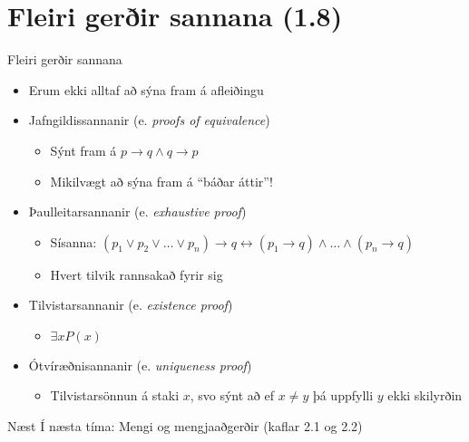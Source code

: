 \documentclass[handout]{beamer}
\begin{document}
\section{Fleiri gerðir sannana (1.8)}

\begin{frame}{Fleiri gerðir sannana}
    \begin{itemize}
        \item Erum ekki alltaf að sýna fram á afleiðingu
        \item Jafngildissannanir (e. \emph{proofs of equivalence})
        \begin{itemize}
            \item Sýnt fram á $p \to q \land q \to p$
            \item Mikilvægt að sýna fram á ``báðar áttir''!
        \end{itemize}
        \item Þaulleitarsannanir (e. \emph{exhaustive proof})
        \begin{itemize}
            \item Sísanna: $(p_1 \lor p_2 \lor \ldots \lor p_n) \to q \leftrightarrow (p_1 \to q) \land \ldots \land (p_n \to q)$
            \item Hvert tilvik rannsakað fyrir sig
        \end{itemize}
        \item Tilvistarsannanir (e. \emph{existence proof})
        \begin{itemize}
            \item $\exists x P(x)$
        \end{itemize}
        \item Ótvíræðnisannanir (e. \emph{uniqueness proof})
        \begin{itemize}
            \item Tilvistarsönnun á staki $x$, svo sýnt að ef $x \neq y$ þá uppfylli $y$ ekki skilyrðin
        \end{itemize}
    \end{itemize}
\end{frame}

\begin{frame}{Næst}
Í næsta tíma: Mengi og mengjaaðgerðir (kaflar 2.1 og 2.2)
\end{frame}
\end{document}
